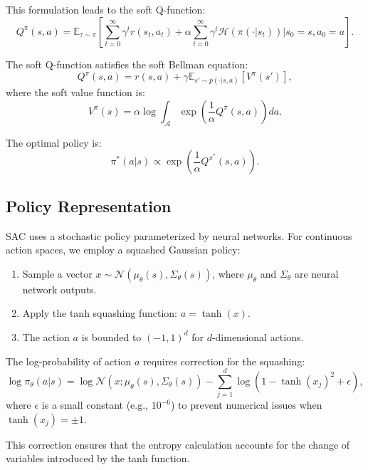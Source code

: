 \documentclass[conference]{IEEEtran}
\begin{document}
This formulation leads to the soft Q-function:
\begin{equation}
Q^\pi(s,a) = \mathbb{E}_{\tau \sim \pi} \left[ \sum_{t=0}^{\infty} \gamma^t r(s_t, a_t) + \alpha \sum_{t=0}^{\infty} \gamma^t \mathcal{H}(\pi(\cdot|s_t)) \bigg| s_0 = s, a_0 = a \right].
\end{equation}

The soft Q-function satisfies the soft Bellman equation:
\begin{equation}
Q^\pi(s,a) = r(s,a) + \gamma \mathbb{E}_{s' \sim p(\cdot|s,a)} \left[ V^\pi(s') \right],
\end{equation}
where the soft value function is:
\begin{equation}
V^\pi(s) = \alpha \log \int_\mathcal{A} \exp\left(\frac{1}{\alpha} Q^\pi(s,a)\right) da.
\end{equation}

The optimal policy is:
\begin{equation}
\pi^*(a|s) \propto \exp\left(\frac{1}{\alpha} Q^{\pi^*}(s,a)\right).
\end{equation}

\subsection{Policy Representation}
SAC uses a stochastic policy parameterized by neural networks. For continuous action spaces, we employ a squashed Gaussian policy:
\begin{enumerate}
  \item Sample a vector $x \sim \mathcal{N}(\mu_\theta(s), \Sigma_\theta(s))$, where $\mu_\theta$ and $\Sigma_\theta$ are neural network outputs.
  \item Apply the tanh squashing function: $a = \tanh(x)$.
  \item The action $a$ is bounded to $(-1, 1)^d$ for $d$-dimensional actions.
\end{enumerate}

The log-probability of action $a$ requires correction for the squashing:
\begin{equation}
\log \pi_\theta(a|s) = \log \mathcal{N}(x; \mu_\theta(s), \Sigma_\theta(s)) - \sum_{j=1}^d \log \left(1 - \tanh(x_j)^2 + \epsilon\right),
\end{equation}
where $\epsilon$ is a small constant (e.g., $10^{-6}$) to prevent numerical issues when $\tanh(x_j) = \pm 1$.

This correction ensures that the entropy calculation accounts for the change of variables introduced by the tanh function.
\end{document}
